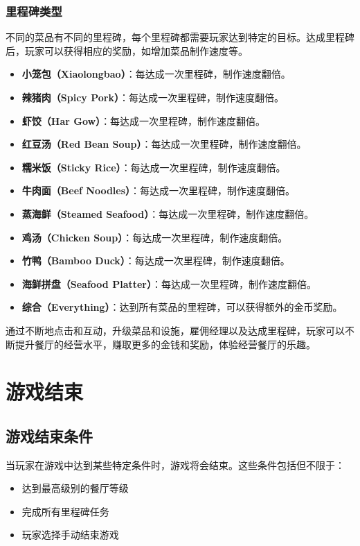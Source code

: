 \documentclass{mancls}%
\begin{document}
\subsubsection{里程碑类型}

不同的菜品有不同的里程碑，每个里程碑都需要玩家达到特定的目标。达成里程碑后，玩家可以获得相应的奖励，如增加菜品制作速度等。

\begin{itemize}
  \item \textbf{小笼包（Xiaolongbao）}：每达成一次里程碑，制作速度翻倍。
  \item \textbf{辣猪肉（Spicy Pork）}：每达成一次里程碑，制作速度翻倍。
  \item \textbf{虾饺（Har Gow）}：每达成一次里程碑，制作速度翻倍。
  \item \textbf{红豆汤（Red Bean Soup）}：每达成一次里程碑，制作速度翻倍。
  \item \textbf{糯米饭（Sticky Rice）}：每达成一次里程碑，制作速度翻倍。
  \item \textbf{牛肉面（Beef Noodles）}：每达成一次里程碑，制作速度翻倍。
  \item \textbf{蒸海鲜（Steamed Seafood）}：每达成一次里程碑，制作速度翻倍。
  \item \textbf{鸡汤（Chicken Soup）}：每达成一次里程碑，制作速度翻倍。
  \item \textbf{竹鸭（Bamboo Duck）}：每达成一次里程碑，制作速度翻倍。
  \item \textbf{海鲜拼盘（Seafood Platter）}：每达成一次里程碑，制作速度翻倍。
  \item \textbf{综合（Everything）}：达到所有菜品的里程碑，可以获得额外的金币奖励。
\end{itemize}

通过不断地点击和互动，升级菜品和设施，雇佣经理以及达成里程碑，玩家可以不断提升餐厅的经营水平，赚取更多的金钱和奖励，体验经营餐厅的乐趣。
\pagebreak
\section{游戏结束}

\subsection{游戏结束条件}

当玩家在游戏中达到某些特定条件时，游戏将会结束。这些条件包括但不限于：
\begin{itemize}
  \item 达到最高级别的餐厅等级
  \item 完成所有里程碑任务
  \item 玩家选择手动结束游戏
\end{itemize}
\end{document}
